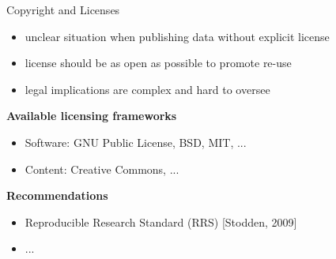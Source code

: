\documentclass{intbeamer}
\begin{document}
\begin{frame}{Copyright and Licenses}


\begin{itemize}
\item unclear situation when publishing data without explicit license
\item license should be as open as possible to promote re-use
\item legal implications are complex and hard to oversee
\end{itemize}

\vfill

\textbf{Available licensing frameworks}
\begin{itemize}
\item Software: GNU Public License, BSD, MIT, ...
\item Content: Creative Commons, ...
\end{itemize}

\vfill

\textbf{Recommendations}
\begin{itemize}
\item Reproducible Research Standard (RRS) {\tiny [Stodden, 2009]}
\item ...
\end{itemize}

\end{frame}
\end{document}
